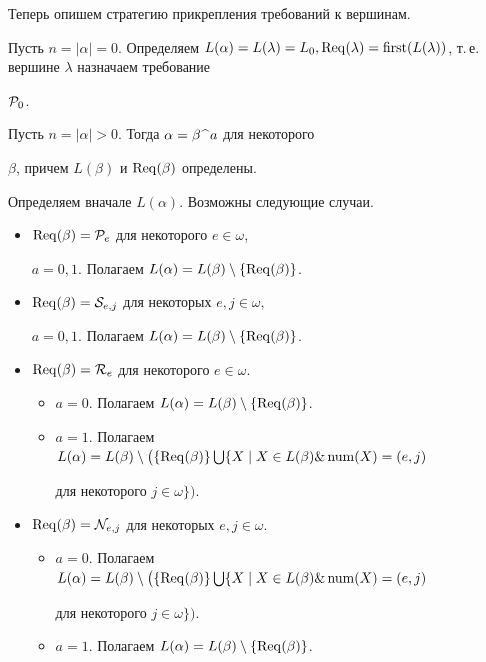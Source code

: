 Теперь опишем стратегию прикрепления требований к вершинам.


 


Пусть $n=|\alpha|=0$. Определяем $L(\alpha)=L(\lambda)=L_0,


\tre (\lambda)=\f (L(\lambda))$, т.\,е. вершине $\lambda$ назначаем требование


${\cal P}_0$.





Пусть $n=|\alpha|>0$. Тогда $\alpha=\beta\,\widehat{\ }\,a$ для некоторого


$\beta$, причем $L(\beta)$ и $\operatorname{Req} (\beta)$ определены.


Определяем вначале $L(\alpha)$. Возможны следующие случаи.


\begin{itemize}


\item[(1)] $\operatorname{Req}(\beta)={\cal P}_e$ для некоторого $e\in\omega$, 


$a=0,1$. Полагаем $L(\alpha)=L(\beta)\setminus\{\operatorname{Req}(\beta)\}$.


\item[(2)] $\operatorname{Req}(\beta)={\cal S}_{e,j}$ для некоторых $e,j\in\omega$,


$a=0,1$. Полагаем $L(\alpha)=L(\beta)\setminus\{\operatorname{Req}(\beta)\}$.


\item[(3)] $\operatorname{Req}(\beta)={\cal R}_e$ для некоторого $e\in\omega$.


\begin{itemize}


\item[(a)] $a=0$. Полагаем $L(\alpha)=L(\beta)\setminus\{\operatorname{Req}(\beta)\}$.


\item[(б)] $a=1$. Полагаем $L(\alpha)=L(\beta)\setminus\bigl(\{\tre(\beta)\}


\bigcup\{X\mid X\in L(\beta)\&{} \num(X)=(e,j)$


для некоторого $j\in\omega\}\bigr)$.


\end{itemize}


\item[(4)] $\operatorname{Req}(\beta)={\cal N}_{e,j}$ для некоторых $e,j\in\omega$.


\begin{itemize}


\item[(a)] $a=0$. Полагаем $L(\alpha)=L(\beta)\setminus\bigl(\{\tre(\beta)\}


\bigcup\{X\mid X\in L(\beta)\&{} \num(X)=(e,j)$


для некоторого $j\in\omega\}\bigr)$.


\item[(б)] $a=1$. Полагаем $L(\alpha)=L(\beta)\setminus


\{\tre(\beta)\}$.


\end{itemize}


\end{itemize}





